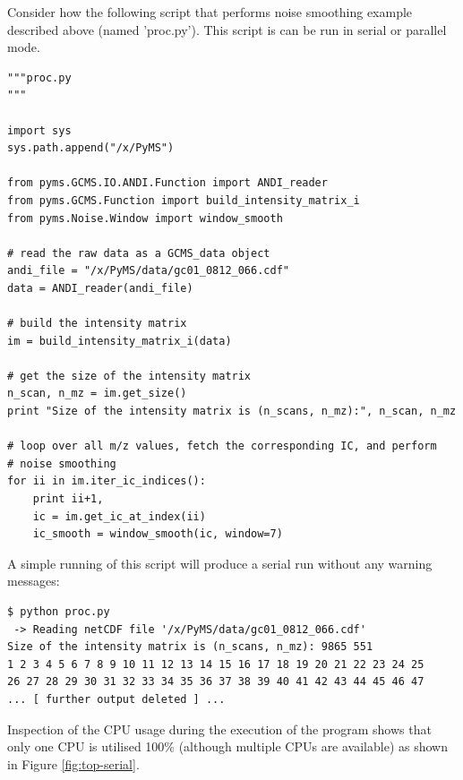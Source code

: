 Consider how the following script that performs noise smoothing example
described above (named 'proc.py'). This script is can be run in serial
or parallel mode.

\begin{verbatim}
"""proc.py
"""

import sys
sys.path.append("/x/PyMS")

from pyms.GCMS.IO.ANDI.Function import ANDI_reader
from pyms.GCMS.Function import build_intensity_matrix_i
from pyms.Noise.Window import window_smooth

# read the raw data as a GCMS_data object
andi_file = "/x/PyMS/data/gc01_0812_066.cdf"
data = ANDI_reader(andi_file)

# build the intensity matrix
im = build_intensity_matrix_i(data)

# get the size of the intensity matrix
n_scan, n_mz = im.get_size()
print "Size of the intensity matrix is (n_scans, n_mz):", n_scan, n_mz

# loop over all m/z values, fetch the corresponding IC, and perform
# noise smoothing
for ii in im.iter_ic_indices():
    print ii+1,
    ic = im.get_ic_at_index(ii)
    ic_smooth = window_smooth(ic, window=7)
\end{verbatim}

A simple running of this script will produce a serial run without
any warning messages:

\begin{verbatim}
$ python proc.py
 -> Reading netCDF file '/x/PyMS/data/gc01_0812_066.cdf'
Size of the intensity matrix is (n_scans, n_mz): 9865 551
1 2 3 4 5 6 7 8 9 10 11 12 13 14 15 16 17 18 19 20 21 22 23 24 25
26 27 28 29 30 31 32 33 34 35 36 37 38 39 40 41 42 43 44 45 46 47
... [ further output deleted ] ...
\end{verbatim}

Inspection of the CPU usage during the execution of the program
shows that only one CPU is utilised 100\% (although multiple CPUs
are available) as shown in Figure \ref{fig:top-serial}.

